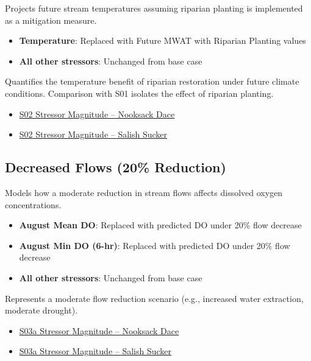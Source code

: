 \documentclass[
  letterpaper,
  DIV=11,
  numbers=noendperiod]{scrreprt}
\providecommand{\tightlist}{%
  \setlength{\itemsep}{0pt}\setlength{\parskip}{0pt}}
\begin{document}
Projects future stream temperatures assuming riparian planting is
implemented as a mitigation measure.

\begin{itemize}
\tightlist
\item
  \textbf{Temperature}: Replaced with Future MWAT with Riparian Planting
  values
\item
  \textbf{All other stressors}: Unchanged from base case
\end{itemize}

Quantifies the temperature benefit of riparian restoration under future
climate conditions. Comparison with S01 isolates the effect of riparian
planting.

\begin{itemize}
\tightlist
\item
  \href{./sample_data/ndss_nooksack_dace/S02_Future\%20Temp\%20and\%20Planting.xlsx}{S02
  Stressor Magnitude -- Nooksack Dace}
\item
  \href{./sample_data/ndss_salish_sucker/S02_Future\%20Temp\%20and\%20Planting.xlsx}{S02
  Stressor Magnitude -- Salish Sucker}
\end{itemize}

\subsection*{Decreased Flows (20\%
Reduction)}\label{decreased-flows-20-reduction}

Models how a moderate reduction in stream flows affects dissolved oxygen
concentrations.

\begin{itemize}
\tightlist
\item
  \textbf{August Mean DO}: Replaced with predicted DO under 20\% flow
  decrease
\item
  \textbf{August Min DO (6-hr)}: Replaced with predicted DO under 20\%
  flow decrease
\item
  \textbf{All other stressors}: Unchanged from base case
\end{itemize}

Represents a moderate flow reduction scenario (e.g., increased water
extraction, moderate drought).

\begin{itemize}
\tightlist
\item
  \href{./sample_data/ndss_nooksack_dace/S03a_Decrease\%20Flows\%2020pct.xlsx}{S03a
  Stressor Magnitude -- Nooksack Dace}
\item
  \href{./sample_data/ndss_salish_sucker/S03a_Decrease\%20Flows\%2020pct.xlsx}{S03a
  Stressor Magnitude -- Salish Sucker}
\end{itemize}
\end{document}
